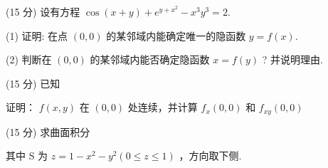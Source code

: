 (15 分) 设有方程 $\cos(x + y) + e^{y + x^2} - x^3 y^3 = 2$.\par
(1) 证明: 在点 $(0,0)$ 的某邻域内能确定唯一的隐函数 $y = f(x)$.\par
(2) 判断在  $(0,0)$  的某邻域内能否确定隐函数  $x = f(y)$ ? 并说明理由.\par
\par{}
(15 分) 已知\par
\nopagebreak[4]
证明： $f(x,y)$ 在 $(0,0)$ 处连续，并计算 $f_{x}(0,0)$ 和 $f_{xy}(0,0)$\par
\par{}
(15 分) 求曲面积分\par
\nopagebreak[4]
其中 S 为  $z = 1 - x^{2} - y^{2} (0 \leq z \leq 1)$ ，方向取下侧.\par
